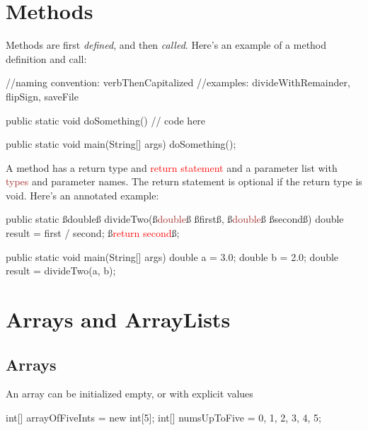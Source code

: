 \section{Methods}

Methods are first \textit{defined}, and then \textit{called}. Here's an example of a method definition and call:

\begin{code}
//naming convention: verbThenCapitalized
//examples: divideWithRemainder, flipSign, saveFile

public static void doSomething() {
    // code here
}

public static void main(String[] args) {
doSomething();
}
\end{code}

A method has a \textcolor{mygreen}{return type} and \textcolor{red}{return statement} and a parameter list with \textcolor{Brown}{types} and \textcolor{Rhodamine}{parameter names}. The return statement is optional if the return type is void. Here's an annotated example:

\begin{code}

public static ß\textcolor{mygreen}{double}ß divideTwo(ß\textcolor{Brown}{double}ß ß\textcolor{Rhodamine}{first}ß, ß\textcolor{Brown}{double}ß ß\textcolor{Rhodamine}{second}ß) {
    double result = first / second;
    ß\textcolor{red}{return second}ß;
}

public static void main(String[] args) {
    double a = 3.0;
    double b = 2.0;
    double result = divideTwo(a, b);
}

\end{code}

\section{Arrays and ArrayLists}

\subsection{Arrays}

An array can be initialized empty, or with explicit values

\begin{code}

int[] arrayOfFiveInts = new int[5];
int[] numsUpToFive = {0, 1, 2, 3, 4, 5};

\end{code}

